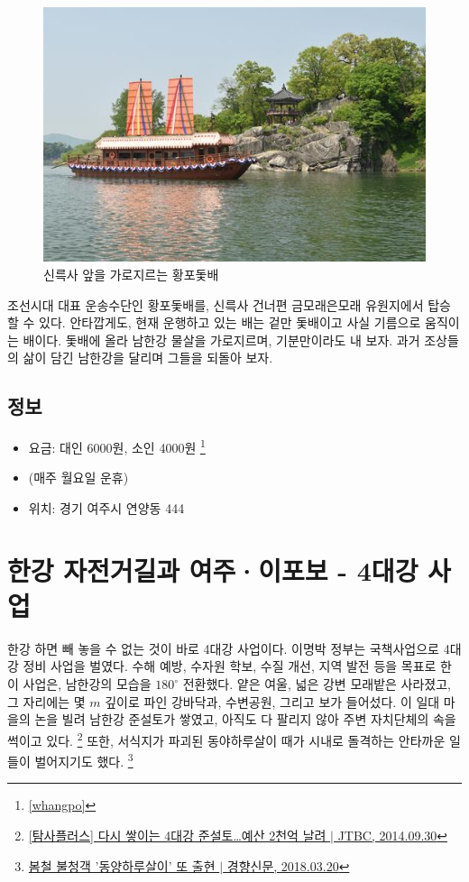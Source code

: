 \begin{figure}
    \centering
    \includegraphics[width=.6\textwidth]{img/황포돛배.jpg}
    \caption{신륵사 앞을 가로지르는 황포돛배\protect\footnotemark}
    \label{fig:my_labe6}
\end{figure}


조선시대 대표 운송수단인 황포돛배를, 신륵사 건너편 금모래은모래 유원지에서 탑승할 수 있다. 
안타깝게도, 현재 운행하고 있는 배는 겉만 돛배이고 사실 기름으로 움직이는 배이다.
돛배에 올라 남한강 물살을 가로지르며, 기분만이라도 내 보자.
과거 조상들의 삶이 담긴 남한강을 달리며 그들을 되돌아 보자.

\subsection{정보}
\begin{itemize}
    \item 요금: 대인 6000원, 소인 4000원 \footnote{\ref{whangpo}}
    \item (매주 월요일 운휴)
    \item 위치: 경기 여주시 연양동 444
\end{itemize}

\section{한강 자전거길과 여주·이포보 - 4대강 사업}

한강 하면 빼 놓을 수 없는 것이 바로 4대강 사업이다.
이명박 정부는 국책사업으로 4대강 정비 사업을 벌였다.
수해 예방, 수자원 학보, 수질 개선, 지역 발전 등을 목표로 한 이 사업은,
남한강의 모습을 $180^\circ$ 전환했다.
얕은 여울, 넓은 강변 모래밭은 사라졌고, 그 자리에는 몇 $m$ 깊이로 파인 강바닥과, 수변공원, 그리고 보가 들어섰다.
이 일대 마을의 논을 빌려 남한강 준설토가 쌓였고,
아직도 다 팔리지 않아 주변 자치단체의 속을 썩이고 있다.
\footnote{\href{https://news.jtbc.joins.com/article/article.aspx?news_id=NB10593178}{[탐사플러스] 다시 쌓이는 4대강 준설토…예산 2천억 날려 $|$ JTBC, 2014.09.30}}
또한, 서식지가 파괴된 동야하루살이 때가 시내로 돌격하는 안타까운 일들이 벌어지기도 했다.
\footnote{\href{http://news.khan.co.kr/kh_news/khan_art_view.html?artid=201803201448001&code=620109}{봄철 불청객 '동양하루살이' 또 출현 $|$ 경향신문, 2018.03.20}}

